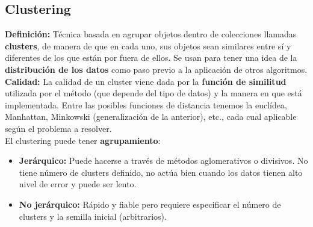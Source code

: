 \subsection*{Clustering}
\textbf{Definición:} Técnica basada en agrupar objetos dentro de colecciones llamadas \textbf{clusters}, de manera de que en cada uno, sus objetos sean similares entre sí y diferentes de los que están por fuera de ellos. Se usan para tener una idea de la \textbf{distribución de los datos} como paso previo a la aplicación de otros algoritmos. \\
\textbf{Calidad:}
La calidad de un cluster viene dada por la \textbf{función de similitud} utilizada por el método (que depende del tipo de datos) y la manera en que está implementada. Entre las posibles funciones de distancia tenemos la euclídea, Manhattan, Minkowski (generalización de la anterior), etc., cada cual aplicable según el problema a resolver. \\
El clustering puede tener \textbf{agrupamiento}:
\begin{itemize}
    \item \textbf{Jerárquico:} Puede hacerse a través de métodos aglomerativos o divisivos. No tiene número de clusters definido, no actúa bien cuando los datos tienen alto nivel de error y puede ser lento.
    \item \textbf{No jerárquico:} Rápido y fiable pero requiere especificar el número de clusters y la semilla inicial (arbitrarios).
\end{itemize}

